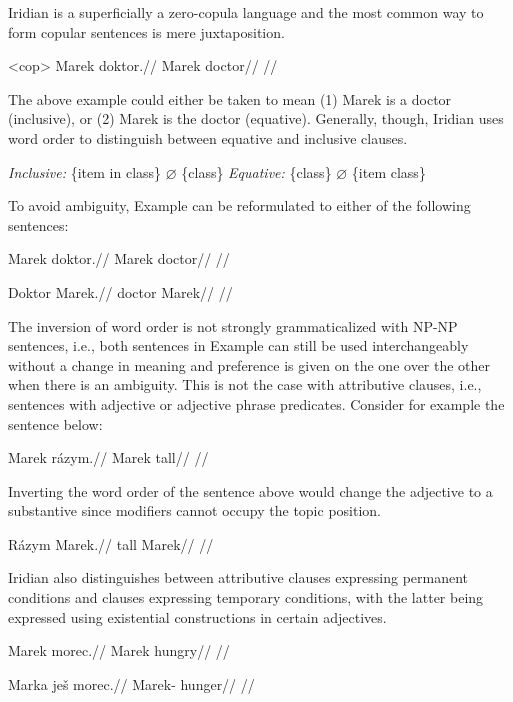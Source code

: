 Iridian is a superficially a zero-copula language and the most common way to form copular sentences is mere juxtaposition.

\pex<cop>
\begingl
\gla Marek doktor.//
\glb Marek doctor//
\glft {}//
\endgl
\xe

The above example could either be taken to mean (1) Marek is a doctor (inclusive), or (2) Marek is the doctor (equative). Generally, though, Iridian uses word order to distinguish between equative and inclusive clauses.

\pex
\a \textit{Inclusive:} \{item in class\} $\varnothing$ \{class\}
\a \textit{Equative:} \{class\} $\varnothing$ \{item class\}
\xe

To avoid ambiguity, Example  can be reformulated to either of the following sentences:

\a
\begingl
\gla Marek doktor.//
\glb Marek doctor//
\glft {}//
\endgl

\a
\begingl
\gla Doktor Marek.//
\glb doctor Marek//
\glft {}//
\endgl

\xe

The inversion of word order is not strongly grammaticalized with NP-NP sentences, i.e., both sentences in Example  can still be used interchangeably without a change in meaning and preference is given on the one over the other when there is an ambiguity. This is not the case with attributive clauses, i.e., sentences with adjective or adjective phrase predicates. Consider for example the sentence below:

\pex
\begingl
\gla Marek rázym.//
\glb Marek tall//
\glft {}//
\endgl
\xe

Inverting the word order of the sentence above would change the adjective to a substantive since modifiers cannot occupy the topic position.

\pex
\begingl
\gla Rázym Marek.//
\glb tall Marek//
\glft {}//
\endgl
\xe

Iridian also distinguishes between attributive clauses expressing permanent conditions and clauses expressing temporary conditions, with the latter being expressed using existential constructions in certain adjectives.

\pex
\begingl
\gla *Marek morec.//
\glb Marek hungry//
\glft {}//
\endgl
\xe


\pex
\begingl
\gla Marka je\v{s} morec.//
\glb Marek-  hunger//
\glft {}//
\endgl
\xe


